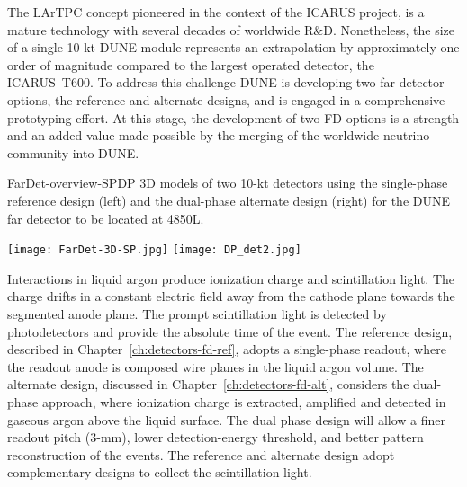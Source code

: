 The LArTPC concept pioneered in the context of the ICARUS project, is
a mature technology with several decades of worldwide R\&D.
Nonetheless, the size of a single 10-kt DUNE module represents an
extrapolation by approximately one order of magnitude compared to the
largest operated detector, the ICARUS~T600. To address this challenge
DUNE is developing two far detector options, the reference and
alternate designs, and is engaged in a comprehensive prototyping
effort. At this stage, the development of two FD options is a strength
and an added-value made possible by the merging of the worldwide
neutrino community into DUNE.

\begin{cdrfigure}{FarDet-overview-SPDP}
{3D models of two 10-kt detectors using the single-phase reference design (left) 
and the dual-phase alternate design (right) for the DUNE far detector to be 
located at 4850L.}
\centering
\begin{minipage}[b]{1.0\textwidth}
\begin{center}
\texttt{[image: FarDet-3D-SP.jpg]}
\texttt{[image: DP\_det2.jpg]}
\end{center}
\end{minipage}
\end{cdrfigure}

Interactions in liquid argon produce ionization charge and
scintillation light.  The charge drifts in a constant electric field
away from the cathode plane towards the segmented anode plane.  The
prompt scintillation light is detected by photodetectors and provide
the absolute time of the event.  The reference design, described in
Chapter~\ref{ch:detectors-fd-ref}, adopts a single-phase readout,
where the readout anode is composed wire planes in the liquid argon
volume.  The alternate design, discussed in
Chapter~\ref{ch:detectors-fd-alt}, considers the dual-phase approach,
where ionization charge is extracted, amplified and detected in
gaseous argon above the liquid surface.  The dual phase design will
allow a finer readout pitch (3-mm), lower detection-energy threshold,
and better pattern reconstruction of the events.  The reference and
alternate design adopt complementary designs to collect the
scintillation light.

